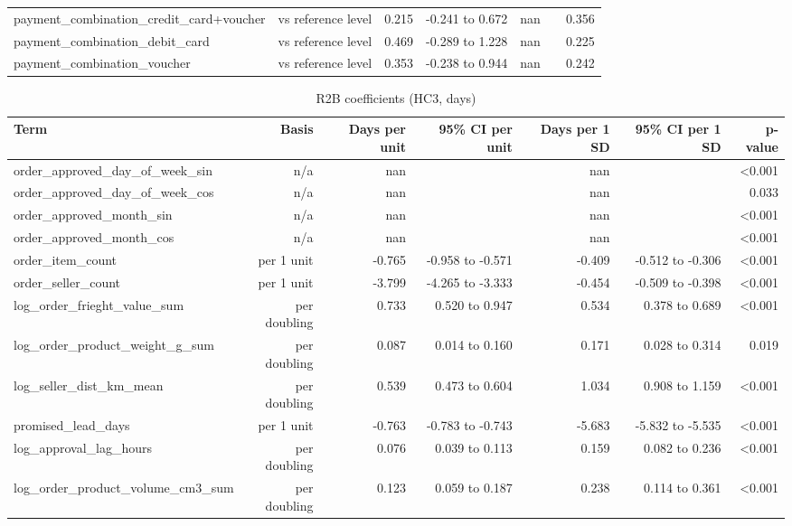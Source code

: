 \begin{table}[htbp]
\begin{tabular}{lrrrrrr}
payment\_combination\_credit\_card+voucher & vs reference level & 0.215 & -0.241 to 0.672 & nan &  & 0.356 \\
payment\_combination\_debit\_card & vs reference level & 0.469 & -0.289 to 1.228 & nan &  & 0.225 \\
payment\_combination\_voucher & vs reference level & 0.353 & -0.238 to 0.944 & nan &  & 0.242 \\
\bottomrule
\end{tabular}
\par\smallskip\begin{minipage}{\linewidth}\footnotesize \end{minipage}
\end{table}


\begin{table}[htbp]
\centering
\small
\caption{R2B coefficients (HC3, days)}
\begin{tabular}{lrrrrrr}
\toprule
Term & Basis & Days per unit & 95\% CI per unit & Days per 1 SD & 95\% CI per 1 SD & p-value \\
\midrule
order\_approved\_day\_of\_week\_sin & n/a & nan &  & nan &  & <0.001 \\
order\_approved\_day\_of\_week\_cos & n/a & nan &  & nan &  & 0.033 \\
order\_approved\_month\_sin & n/a & nan &  & nan &  & <0.001 \\
order\_approved\_month\_cos & n/a & nan &  & nan &  & <0.001 \\
order\_item\_count & per 1 unit & -0.765 & -0.958 to -0.571 & -0.409 & -0.512 to -0.306 & <0.001 \\
order\_seller\_count & per 1 unit & -3.799 & -4.265 to -3.333 & -0.454 & -0.509 to -0.398 & <0.001 \\
log\_order\_frieght\_value\_sum & per doubling & 0.733 & 0.520 to 0.947 & 0.534 & 0.378 to 0.689 & <0.001 \\
log\_order\_product\_weight\_g\_sum & per doubling & 0.087 & 0.014 to 0.160 & 0.171 & 0.028 to 0.314 & 0.019 \\
log\_seller\_dist\_km\_mean & per doubling & 0.539 & 0.473 to 0.604 & 1.034 & 0.908 to 1.159 & <0.001 \\
promised\_lead\_days & per 1 unit & -0.763 & -0.783 to -0.743 & -5.683 & -5.832 to -5.535 & <0.001 \\
log\_approval\_lag\_hours & per doubling & 0.076 & 0.039 to 0.113 & 0.159 & 0.082 to 0.236 & <0.001 \\
log\_order\_product\_volume\_cm3\_sum & per doubling & 0.123 & 0.059 to 0.187 & 0.238 & 0.114 to 0.361 & <0.001 \\

\end{tabular}
\end{table}
